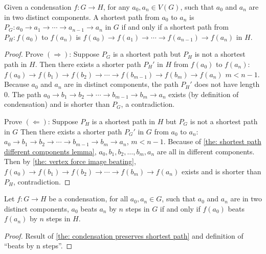 \begin{theorem}\label{the: condensation preserves shortest path}
  Given a condensation \(f: G \to H\),
  for any \(a_0, a_n \in V(G)\),
  such that \(a_0\) and \(a_n\) are in two distinct components.
  A shortest path from \(a_0\) to \(a_n\) is
  \(P_G: a_0 \to a_1 \to \cdots \to a_{n-1} \to a_n\) in \(G\)
  if and only if a shortest path from \(P_H: f(a_0)\) to \(f(a_n)\) is
  \(f(a_0) \to f(a_1) \to \cdots \to f(a_{n-1}) \to f(a_n)\)
  in \(H\).
\end{theorem}

\begin{proof}
  Prove \((\Rightarrow )\):
  Suppose \(P_G\) is a shortest path but \(P_H\) is not a
  shortest path in \(H\).
  Then there exists a shorter path \(P_H'\) in \(H\)
  from \(f(a_0)\) to \(f(a_n)\): \(f(a_0)
    \to f(b_1) \to f(b_2) \to \cdots \to f(b_{m-1}) \to f(b_m)
    \to f(a_n)\) \(m < n-1\).
  Because \(a_0\) and \(a_n\) are in distinct components,
  the path \(P_H'\) does not have length 0.
  The path \(a_0 \to b_1 \to b_2 \to \cdots \to b_{m-1} \to b_m \to a_n\)
  exists (by definition of condensation) and is shorter than
  \(P_G\), a contradiction.

  Prove \((\Leftarrow )\):
  Suppose \(P_H\) is a shortest path in \(H\) but \(P_G\) is
  not a shortest path in \(G\)
  Then there exists a shorter path \(P_G'\) in \(G\)
  from \(a_0\) to \(a_n\):
  \(a_0 \to b_1 \to b_2 \to \cdots \to b_{m-1} \to b_m \to a_n\), \(m < n-1\).
  Because of \cref{the: shortest path different components lemma},
  \(a_0, b_1, b_2, \ldots, b_m, a_n\)
  are all in different components.
  Then by \cref{the: vertex force image beating},
  \(f(a_0) \to f(b_1) \to f(b_2) \to \cdots \to f(b_m) \to f(a_n)\)
  exists and is shorter than \(P_H\), contradiction.
\end{proof}

\begin{corollary}\label{the: condensation preserves beating in distinct components}
  Let \(f: G \to H\) be a condensation,
  for all \(a_0, a_n \in G\),
  such that \(a_0\) and \(a_n\) are in two distinct components,
  \(a_0\) beats \(a_n\) by \(n\) steps in \(G\) if and only if
  \(f(a_0)\) beats \(f(a_n)\) by \(n\) steps in \(H\).
\end{corollary}

\begin{proof}
  Result of \cref{the: condensation preserves shortest path}
  and definition of ``beats by n steps''.
\end{proof}

